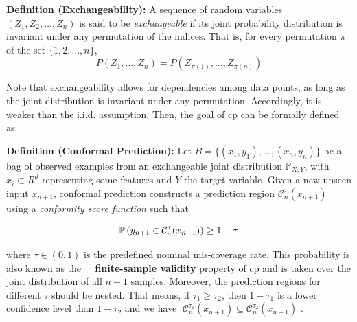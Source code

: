 \noindent
\textbf{Definition (Exchangeability):}  
A sequence of random variables \( (Z_1, Z_2, \dots, Z_n) \) is said to be \textit{exchangeable} if its joint probability distribution is invariant under any permutation of the indices. That is, for every permutation \( \pi \) of the set \( \{1, 2, \dots, n\} \),
\[
P(Z_1, \dots, Z_n) = P(Z_{\pi(1)}, \dots, Z_{\pi(n)})
\]

\noindent Note that exchangeability allows for dependencies among data points, as long as the joint distribution is invariant under any permutation. Accordingly, it is weaker than the i.i.d. assumption. Then, the goal of \gls{cp} can be formally defined as: 
\newline

\noindent
\textbf{Definition (Conformal Prediction):}  Let \(B = \{(x_1, y_1), \dots, (x_n, y_n)\}\) be a bag of observed examples from an exchangeable joint distribution $\mathbb{P}_{X,Y}$, with $x_i \subset R^d$ representing some features and  $Y$ the target variable. Given a new unseen input \(x_{n+1}\), conformal prediction constructs a prediction region \( \mathcal{C}_n^\tau(x_{n+1}) \) using a \textit{conformity score function} such that
\vspace{0.7em}

\begin{equation}
\mathbb{P}\left( y_{n+1} \in \mathcal{C}_n^\tau(x_{n+1}) \right) \geq 1 - \tau
\vspace{1em}
\label{eq: finitecp}
\end{equation}

\noindent
where \( \tau \in (0, 1) \) is the predefined nominal mis-coverage rate. This probability is also known as the \textbf{finite-sample validity} property of \gls{cp} and is taken over the joint distribution of all \(n + 1\) samples. Moreover, the prediction regions for different $\tau$ should be nested. That means, if  $\tau_1 \ge \tau_2$, then $1 - \tau_1$ is a lower confidence level than $1 - \tau_2$ and we have $ \; \mathcal{C}_n^{\tau_1}(x_{n+1}) \subseteq \mathcal{C}_n^{\tau_2}(x_{n+1})$ \cite{shafer2008tutorial}.  


